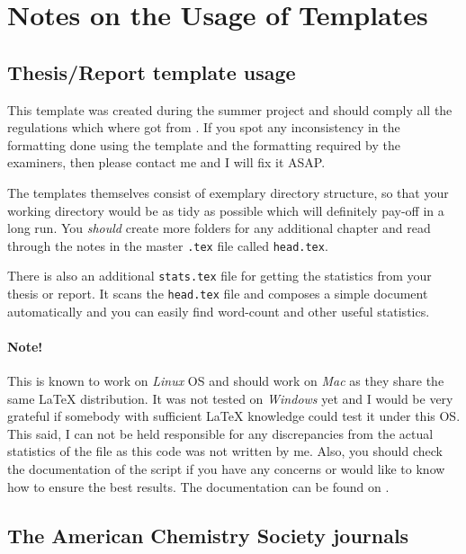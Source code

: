 \section{Notes on the Usage of Templates}

\subsection{Thesis/Report template usage}

This template was created during the summer project and should comply all the
regulations which where got from
.
%
If you spot any inconsistency in the formatting done using the template and the
formatting required by the examiners, then please contact me and I will fix it
ASAP.

The templates themselves consist of exemplary directory structure, so that your
working directory would be as tidy as possible which will definitely pay-off in
a long run.
%
You \emph{should} create more folders for any additional chapter and read
through the notes in the master \verb|.tex| file called \verb|head.tex|.

There is also an additional \verb|stats.tex| file for getting the statistics
from your thesis or report.
%
It scans the \verb|head.tex| file and composes a simple document automatically
and you can easily find word-count and other useful statistics.

\paragraph{Note!} This is known to work on \emph{Linux} OS and should work on
\emph{Mac} as they share the same \LaTeX{} distribution.
%
It was not tested on \emph{Windows} yet and I would be very grateful if somebody
with sufficient \LaTeX{} knowledge could test it under this OS.
%
This said, I can not be held responsible for any discrepancies from the actual
statistics of the file as this code was not written by me.
%
Also, you should check the documentation of the script if you have any concerns
or would like to know how to ensure the best results.
%
The documentation can be found on
.

\subsection{The American Chemistry Society journals}

